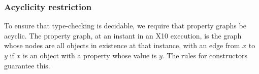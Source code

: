 \subsubsection{Acyclicity restriction}

To ensure that type-checking is decidable, we require that property graphs be
acyclic.  The property graph, at an instant in an X10 execution, is the graph
whose nodes are all objects in existence at that instance, with an edge from
{$x$} to {$y$} if {$x$} is an object with a property whose value is {$y$}. 
The rules for constructors guarantee this.



